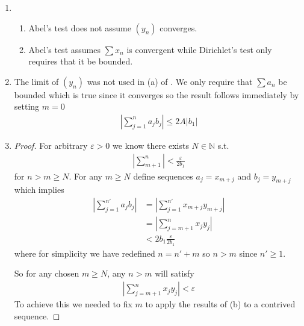 \begin{enumerate}[label=(\alph*)]
    \item 
    \begin{enumerate}[label=(\roman*)]
        \item 
        Abel's test does not assume $(y_n)$ converges.

        \item
        Abel's test assumes $\sum x_n$ is convergent while Dirichlet's
        test only requires that it be bounded.
    \end{enumerate}

    \item 
    The limit of $(y_n)$ was not used in (a) of . We only 
    require that $\sum a_n$ be bounded which is true since it converges 
    so the result follows immediately by setting $m=0$
    \begin{align*}
        |\sum_{j=1}^n a_j b_j| \leq 2A |b_{1}| 
    \end{align*}

    \item 
    \begin{proof}
        For arbitrary $\varepsilon > 0$ we know there exists 
        $N \in \mathbb{N}$ s.t.
        \begin{align*}
            |\sum_{m+1}^n| < \frac{\varepsilon}{2b_1}
        \end{align*}
        for $n > m \geq N$. For any $m \geq N$
        define sequences $a_j = x_{m+j}$ and $b_j = y_{m+j}$
        which implies 
        \begin{align*}
            |\sum_{j=1}^{n'} a_j b_j| &= |\sum_{j=1}^{n'} x_{m+j} y_{m+j}| \\
            &= |\sum_{j=m+1}^{n} x_{j} y_{j}| \\
            &< 2b_1 \frac{\varepsilon}{2b_1}
        \end{align*}
        where for simplicity we have redefined $n=n'+m$ so $n > m$
        since $n'\geq 1$.

        So for any chosen $m\geq N$, any $n>m$ will satisfy 
        \begin{align*}
            |\sum_{j=m+1}^{n} x_{j} y_{j}| < \varepsilon
        \end{align*}
        To achieve this we needed to fix $m$ to apply the results of (b)
        to a contrived sequence.
    \end{proof}
\end{enumerate}